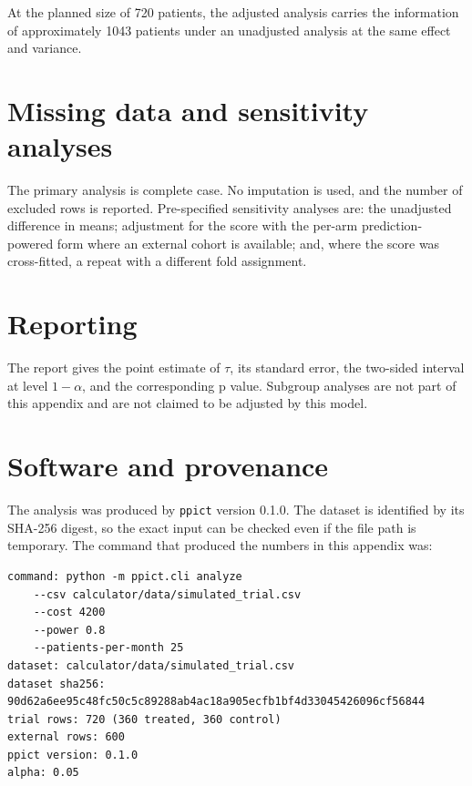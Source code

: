 \documentclass[11pt]{article}
\begin{document}
At the planned size of 720 patients, the adjusted analysis carries
the information of approximately 1043 patients
under an unadjusted analysis at the same effect and variance.


\section{Missing data and sensitivity analyses}

The primary analysis is complete case. No imputation is used, and the number of
excluded rows is reported. Pre-specified sensitivity analyses are: the unadjusted
difference in means; adjustment for the score with the per-arm prediction-powered
form where an external cohort is available; and, where the score was cross-fitted,
a repeat with a different fold assignment.

\section{Reporting}

The report gives the point estimate of $\tau$, its standard error, the two-sided
interval at level $1-\alpha$, and the corresponding p value. Subgroup analyses are
not part of this appendix and are not claimed to be adjusted by this model.

\section{Software and provenance}

The analysis was produced by \texttt{ppict} version 0.1.0. The
dataset is identified by its SHA-256 digest, so the exact input can be checked
even if the file path is temporary. The command that produced the numbers in this
appendix was:

{\footnotesize
\begin{verbatim}
command: python -m ppict.cli analyze
    --csv calculator/data/simulated_trial.csv
    --cost 4200
    --power 0.8
    --patients-per-month 25
dataset: calculator/data/simulated_trial.csv
dataset sha256: 90d62a6ee95c48fc50c5c89288ab4ac18a905ecfb1bf4d33045426096cf56844
trial rows: 720 (360 treated, 360 control)
external rows: 600
ppict version: 0.1.0
alpha: 0.05
\end{verbatim}
}
\end{document}
